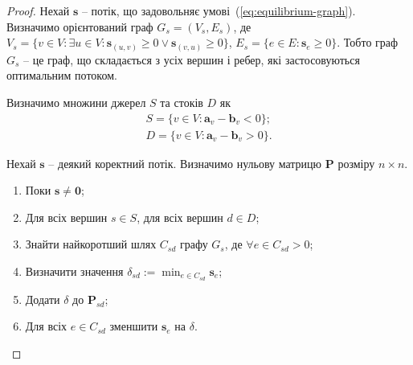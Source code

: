 \begin{proof}
    Нехай $\mathbf{s}$ -- потік, що задовольняє умові~(\ref{eq:equilibrium-graph}). Визначимо орієнтований граф
    $G_s = (V_s, E_s)$, де $V_s = \{v \in V: \exists u \in V: \mathbf{s}_{(u, v)} \ge 0 \lor \mathbf{s}_{(v, u)} \ge 0\}$,
    $E_s = \{e \in E : \mathbf{s}_e \ge 0\}$.
    Тобто граф $G_s$ -- це граф, що складається з усіх вершин і ребер, які застосовуються оптимальним потоком.

    Визначимо множини джерел $S$ та стоків $D$ як
    \begin{eqnarray*}
        S = \{v \in V: \mathbf{a}_v - \mathbf{b}_v < 0\}; \\ 
        D = \{v \in V: \mathbf{a}_v - \mathbf{b}_v > 0\}.
    \end{eqnarray*}

    Нехай $\mathbf{s}$ -- деякий коректний потік. Визначимо нульову матрицю $\mathbf{P}$ розміру $n \times n$.
    \begin{enumerate}
        \item Поки $\mathbf{s} \neq \mathbf{0}$;
        \item Для всіх вершин $s \in S$, для всіх вершин $d \in D$;
        \item Знайти найкоротший шлях $C_{sd}$ графу $G_s$, де $\forall e \in C_{sd} > 0$;
        \item Визначити значення $\delta_{sd} := \min_{e \in C_{sd}} \mathbf{s}_e$;
        \item Додати $\delta$ до $\mathbf{P}_{sd}$;
        \item Для всіх $e \in C_{sd}$ зменшити $\mathbf{s}_e$ на $\delta$.
    \end{enumerate}


\end{proof}
